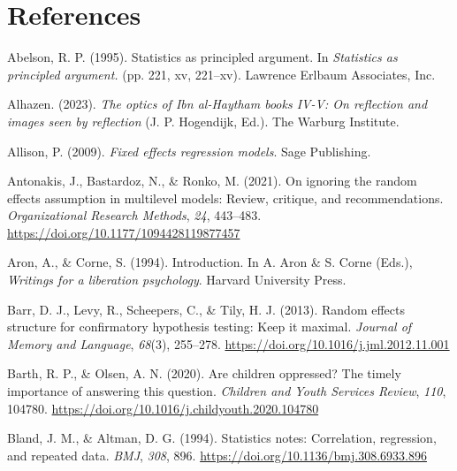 \documentclass[
  letterpaper,
  DIV=11,
  numbers=noendperiod]{scrreprt}
\newlength{\cslhangindent}
\newenvironment{CSLReferences}[2] %
 {\begin{list}{}{%
  \setlength{\itemindent}{0pt}
  \setlength{\leftmargin}{0pt}
  \setlength{\parsep}{0pt}
  \ifodd #1
   \setlength{\leftmargin}{\cslhangindent}
   \setlength{\itemindent}{-1\cslhangindent}
  \fi
  \setlength{\itemsep}{#2\baselineskip}}}
 {\end{list}}
\begin{document}

\chapter*{References}\label{references}


\label{refs}
\begin{CSLReferences}{1}{0}
Abelson, R. P. (1995). Statistics as principled argument. In
\emph{Statistics as principled argument.} (pp. 221, xv, 221--xv).
Lawrence Erlbaum Associates, Inc.

Alhazen. (2023). \emph{The optics of {I}bn al-{H}aytham books {IV-V}: On
reflection and images seen by reflection} (J. P. Hogendijk, Ed.). The
Warburg Institute.

Allison, P. (2009). \emph{Fixed effects regression models}. Sage
Publishing.

Antonakis, J., Bastardoz, N., \& Ronko, M. (2021). On ignoring the
random effects assumption in multilevel models: Review, critique, and
recommendations. \emph{Organizational Research Methods}, \emph{24},
443--483. \url{https://doi.org/10.1177/1094428119877457}

Aron, A., \& Corne, S. (1994). Introduction. In A. Aron \& S. Corne
(Eds.), \emph{Writings for a liberation psychology}. Harvard University
Press.

Barr, D. J., Levy, R., Scheepers, C., \& Tily, H. J. (2013). Random
effects structure for confirmatory hypothesis testing: Keep it maximal.
\emph{Journal of Memory and Language}, \emph{68}(3), 255--278.
\url{https://doi.org/10.1016/j.jml.2012.11.001}

Barth, R. P., \& Olsen, A. N. (2020). Are children oppressed? The timely
importance of answering this question. \emph{Children and Youth Services
Review}, \emph{110}, 104780.
\url{https://doi.org/10.1016/j.childyouth.2020.104780}

Bland, J. M., \& Altman, D. G. (1994). Statistics notes: Correlation,
regression, and repeated data. \emph{BMJ}, \emph{308}, 896.
\url{https://doi.org/10.1136/bmj.308.6933.896}


\end{CSLReferences}
\end{document}
